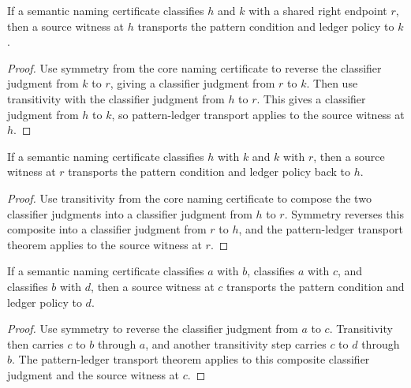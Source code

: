 \begin{theorem}
\label{thm:semantic-name-cert-classifier-right-confluence-transport}
If a semantic naming certificate classifies $h$ and $k$ with a shared right
endpoint $r$, then a source witness at $h$ transports the pattern condition
and ledger policy to $k$.
\end{theorem}
\begin{proof}
Use symmetry from the core naming certificate to reverse the classifier
judgment from $k$ to $r$, giving a classifier judgment from $r$ to $k$. Then
use transitivity with the classifier judgment from $h$ to $r$. This gives a
classifier judgment from $h$ to $k$, so pattern-ledger transport applies to
the source witness at $h$.
\end{proof}

\begin{theorem}
\label{thm:semantic-name-cert-classifier-reverse-chain-transport}
If a semantic naming certificate classifies \(h\) with \(k\) and \(k\) with
\(r\), then a source witness at \(r\) transports the pattern condition and
ledger policy back to \(h\).
\end{theorem}
\begin{proof}
Use transitivity from the core naming certificate to compose the two classifier
judgments into a classifier judgment from \(h\) to \(r\). Symmetry reverses
this composite into a classifier judgment from \(r\) to \(h\), and the
pattern-ledger transport theorem applies to the source witness at \(r\).
\end{proof}

\begin{theorem}
\label{thm:semantic-namecert-classifier-diamond-transport}
If a semantic naming certificate classifies $a$ with $b$, classifies $a$ with
$c$, and classifies $b$ with $d$, then a source witness at $c$ transports the
pattern condition and ledger policy to $d$.
\end{theorem}
\begin{proof}
Use symmetry to reverse the classifier judgment from $a$ to $c$. Transitivity
then carries $c$ to $b$ through $a$, and another transitivity step carries
$c$ to $d$ through $b$. The pattern-ledger transport theorem applies to this
composite classifier judgment and the source witness at $c$.
\end{proof}

